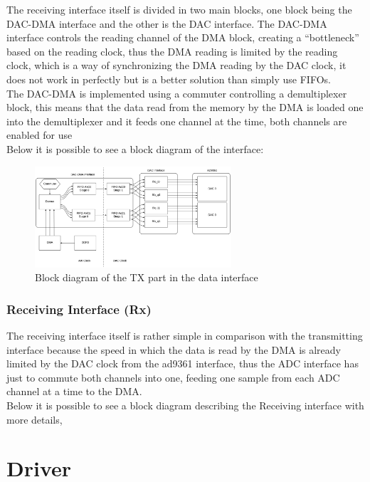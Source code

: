 The receiving interface itself is divided in two main blocks, one block being the
DAC-DMA interface and the other is the DAC interface. The DAC-DMA interface controls
the reading channel of the DMA block, creating a “bottleneck” based on the reading
clock, thus the DMA reading is limited by the reading clock, which is a way of
synchronizing the DMA reading by the DAC clock, it does not work in perfectly but
is a better solution than simply use FIFOs. \\

The DAC-DMA is implemented using a commuter controlling a demultiplexer block,
this means that the data read from the memory by the DMA is loaded one into the
demultiplexer and it feeds one channel at the time, both channels are enabled
for use\\

Below it is possible to see a block diagram of the interface:

\begin{figure}[htbp]
    \centering
    \includegraphics[width=0.65\textwidth]{./figures/txdata_if}
    \caption{ Block diagram of the TX part in the data interface
    \label{fig:dataiftx}}
\end{figure}

\subsubsection{Receiving Interface (Rx)}

The receiving interface itself is rather simple in comparison with the transmitting
interface because the speed in which the data is read by the DMA is already limited
by the DAC clock from the ad9361 interface, thus the ADC interface has just to commute
both channels into one, feeding one sample from each ADC channel at a time to the DMA.\\

Below it is possible to see a block diagram describing the Receiving interface with
more details,

\section{Driver}

